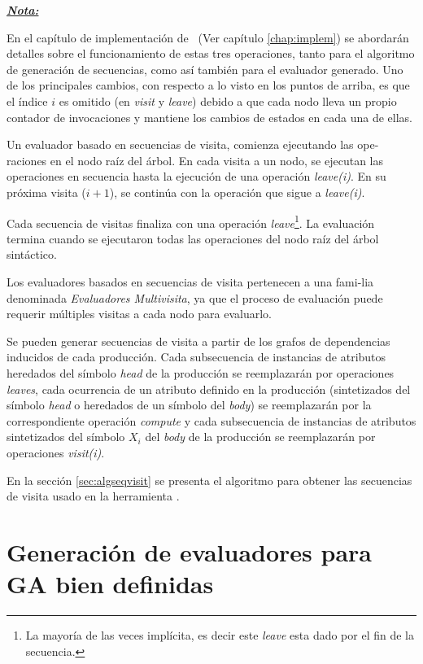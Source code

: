 \underline{\textit{\textbf{Nota:}}}

En el capítulo de implementación de \maggen\ (Ver capítulo \ref{chap:implem}) se abordarán detalles sobre el funcionamiento de estas tres operaciones, tanto para el algoritmo de generación de secuencias, como así también para el evaluador generado. Uno de los principales cambios, con respecto a lo visto en los puntos de arriba, es que el índice $i$ es omitido (en \emph{visit} y \emph{leave}) debido a que cada nodo lleva un propio contador de invocaciones y mantiene los cambios de estados en cada una de ellas.  

Un evaluador basado en secuencias de visita, comienza ejecutando las ope-raciones en el nodo raíz del árbol. En cada visita a un nodo, se ejecutan las operaciones en secuencia hasta la ejecución de una operación \emph{leave(i)}.
En su próxima visita ($i+1$), se continúa con la operación que sigue a \emph{leave(i)}.

Cada secuencia de visitas finaliza con una operación \emph{leave}\footnote{La mayoría de las veces implícita, es decir este \emph{leave} esta dado por el fin de la secuencia.}. La evaluación termina cuando se ejecutaron todas las operaciones del nodo raíz del árbol sintáctico.

Los evaluadores basados en secuencias de visita pertenecen a una fami-lia denominada \emph{Evaluadores Multivisita}, ya que el proceso de evaluación puede requerir múltiples visitas a cada nodo para evaluarlo.

Se pueden generar secuencias de visita a partir de los grafos de dependencias inducidos de cada producción. Cada subsecuencia de instancias de atributos heredados del símbolo \textit{head} de la producción se reemplazarán por operaciones \emph{leaves}, cada ocurrencia de un atributo definido en la producción (sintetizados del símbolo \textit{head} o heredados de un símbolo del \textit{body}) se reemplazarán por la correspondiente operación \emph{compute} y cada subsecuencia de instancias de atributos sintetizados del símbolo $X_i$ del \textit{body} de la producción se reemplazarán por operaciones \emph{visit(i)}.

En la sección \ref{sec:algseqvisit} se presenta el algoritmo para obtener las secuencias de visita usado en la herramienta \maggen.

\section{Generación de evaluadores para GA bien definidas}

